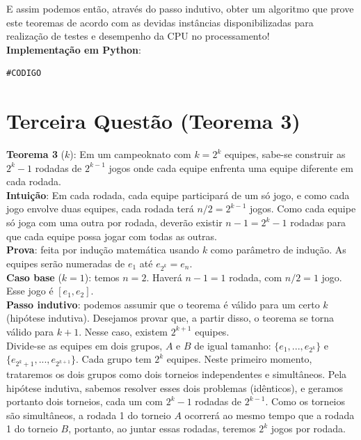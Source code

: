 \documentclass{article}
\begin{document}
E assim podemos então, através do passo indutivo, obter um algoritmo que prove este teoremas de acordo com as devidas instâncias disponibilizadas para realização de testes e desempenho da CPU no processamento!\\

\textbf{Implementação em Python}:

{\color{blue}
\begin{verbatim}
#CODIGO
\end{verbatim}
}

\pagebreak

\section{Terceira Questão (Teorema 3)}

\textbf{Teorema 3} ($k$): Em um campeoknato com $k = 2^k$ equipes, sabe-se construir as $2^k - 1$ rodadas de $2^{k - 1}$ jogos onde cada equipe enfrenta uma equipe diferente em cada rodada.\\

\textbf{Intuição}: Em cada rodada, cada equipe participará de um só jogo, e como cada jogo envolve duas equipes, cada rodada terá $n/2 = 2^{k-1}$ jogos. Como cada equipe só joga com uma outra por rodada, deverão existir $n-1 = 2^k -1$ rodadas para que cada equipe possa jogar com todas as outras.\\

\textbf{Prova}: feita por indução matemática usando $k$ como parâmetro de indução. As equipes serão numeradas de $e_1$ até $e_{2^k} = e_n$.\\

\textbf{Caso base} ($k = 1$): temos $n = 2$. Haverá $n-1 = 1$ rodada, com $n/2 = 1$ jogo. Esse jogo é $[e_1, e_2]$.\\

\textbf{Passo indutivo}: podemos assumir que o teorema é válido para um certo $k$ (hipótese indutiva). Desejamos provar que, a partir disso, o teorema se torna válido para $k+1$. Nesse caso, existem $2^{k+1}$ equipes.\\

Divide-se as equipes em dois grupos, $A$ e $B$ de igual tamanho: $\{e_1, ..., e_{2^k}\}$ e $\{e_{2^k+1}, ..., e_{2^{k+1}}\}$. Cada grupo tem $2^k$ equipes. Neste primeiro momento, trataremos os dois grupos como dois torneios independentes e simultâneos. Pela hipótese indutiva, sabemos resolver esses dois problemas (idênticos), e geramos portanto dois torneios, cada um com $2^k - 1$ rodadas de $2^{k - 1}$. Como os torneios são simultâneos, a rodada 1 do torneio $A$ ocorrerá ao mesmo tempo que a rodada 1 do torneio $B$, portanto, ao juntar essas rodadas, teremos $2^k$ jogos por rodada.\\
\end{document}

